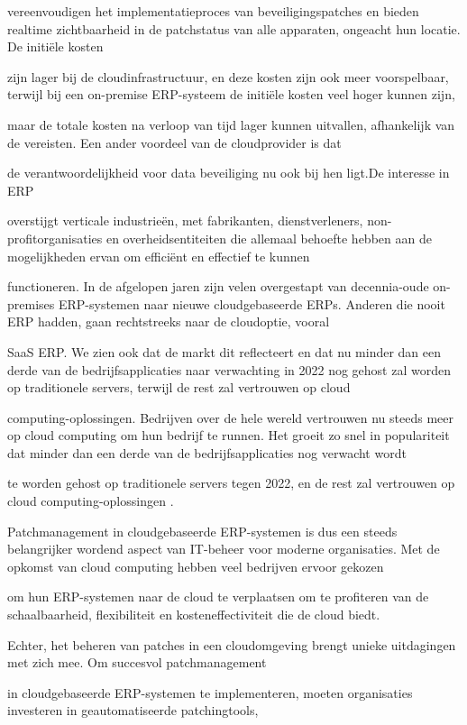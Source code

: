 vereenvoudigen het implementatieproces van beveiligingspatches en bieden realtime zichtbaarheid in de patchstatus van alle apparaten, ongeacht hun locatie. De initiële kosten 

zijn lager bij de cloudinfrastructuur, en deze kosten zijn ook meer voorspelbaar, terwijl bij een on-premise ERP-systeem de initiële kosten veel hoger kunnen zijn, 

maar de totale kosten na verloop van tijd lager kunnen uitvallen, afhankelijk van de vereisten. Een ander voordeel van de cloudprovider is dat

de verantwoordelijkheid voor data beveiliging nu ook bij hen ligt.De interesse in ERP

overstijgt verticale industrieën, met fabrikanten, dienstverleners, non-profitorganisaties en overheidsentiteiten die allemaal behoefte hebben aan de mogelijkheden ervan om efficiënt en effectief te kunnen

functioneren. In de afgelopen jaren zijn velen overgestapt van decennia-oude on-premises ERP-systemen naar nieuwe cloudgebaseerde ERPs. Anderen die nooit ERP hadden, gaan rechtstreeks naar de cloudoptie, vooral 

SaaS ERP. We zien ook dat de markt dit reflecteert en dat nu minder dan een derde van de bedrijfsapplicaties naar verwachting in 2022 nog gehost zal worden op traditionele servers, terwijl de rest zal vertrouwen op cloud

computing-oplossingen. Bedrijven over de hele wereld vertrouwen nu steeds meer op cloud computing om hun bedrijf te runnen. Het groeit zo snel in populariteit dat minder dan een derde van de bedrijfsapplicaties nog verwacht wordt 

te worden gehost op traditionele servers tegen 2022, en de rest zal vertrouwen op cloud computing-oplossingen \autocite{Pimentel2017}.

Patchmanagement in cloudgebaseerde ERP-systemen is dus een steeds belangrijker wordend aspect van IT-beheer voor moderne organisaties. Met de opkomst van cloud computing hebben veel bedrijven ervoor gekozen

om hun ERP-systemen naar de cloud te verplaatsen om te profiteren van de schaalbaarheid, flexibiliteit en kosteneffectiviteit die de cloud biedt. 

Echter, het beheren van patches in een cloudomgeving brengt unieke uitdagingen met zich mee. Om succesvol patchmanagement

in cloudgebaseerde ERP-systemen te implementeren, moeten organisaties investeren in geautomatiseerde patchingtools, 

